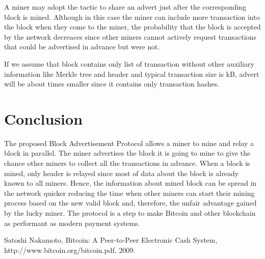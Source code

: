 \documentclass[12pt]{elsarticle}
\begin{document}
A miner may adopt the tactic to share an advert just after the corresponding block is mined. Although in this case the miner can include more transaction into the block when they come to the miner, the probability that the block is accepted by the network decreaces since other miners cannot actively request transactions that could be advertised in advance but were not.

If we assume that block contains only list of transaction without other auxiliary information like Merkle tree and header and typical transaction size is kB, advert will be about  times smaller since it contains only transaction hashes.

\section{Conclusion}
\label{conclusion}

The proposed Block Advertisement Protocol allows a miner to mine and relay a block in parallel. The miner advertises the block it is going to mine to give the chance other miners to collect all the transactions in advance. When a block is mined, only header is relayed since most of data about the block is already known to all miners. Hence, the information about mined block can be  spread in the network quicker reducing the time when other miners can start their mining process based on the new valid block and, therefore, the unfair advantage gained by the lucky miner. The protocol is a step to make Bitcoin and other blockchain as performant as modern payment systems.

\begin{thebibliography}{9}

  Satoshi Nakamoto,
  Bitcoin: A Peer-to-Peer Electronic Cash System,
  http://www.bitcoin.org/bitcoin.pdf,
  2009.

\end{thebibliography}
\end{document}
